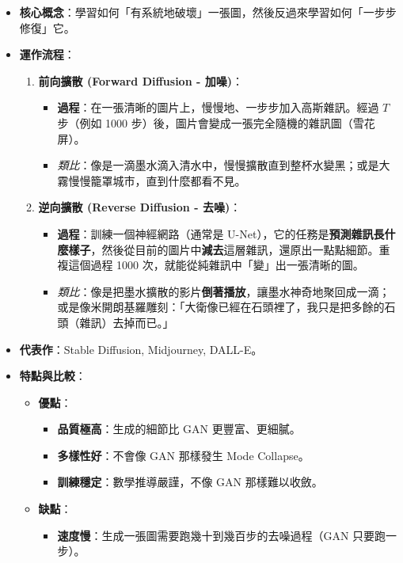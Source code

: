 \documentclass[
  letterpaper,
  DIV=11,
  numbers=noendperiod]{scrreprt}
\providecommand{\tightlist}{%
  \setlength{\itemsep}{0pt}\setlength{\parskip}{0pt}}
\begin{document}
\begin{itemize}
\tightlist
\item
  \textbf{核心概念}：學習如何「有系統地破壞」一張圖，然後反過來學習如何「一步步修復」它。
\item
  \textbf{運作流程}：

  \begin{enumerate}
  \def\labelenumi{\arabic{enumi}.}
  \tightlist
  \item
    \textbf{前向擴散 (Forward Diffusion - 加噪)}：

    \begin{itemize}
    \tightlist
    \item
      \textbf{過程}：在一張清晰的圖片上，慢慢地、一步步加入高斯雜訊。經過
      \(T\) 步（例如 1000
      步）後，圖片會變成一張完全隨機的雜訊圖（雪花屏）。
    \item
      \emph{類比}：像是一滴墨水滴入清水中，慢慢擴散直到整杯水變黑；或是大霧慢慢籠罩城市，直到什麼都看不見。
    \end{itemize}
  \item
    \textbf{逆向擴散 (Reverse Diffusion - 去噪)}：

    \begin{itemize}
    \tightlist
    \item
      \textbf{過程}：訓練一個神經網路（通常是
      U-Net），它的任務是\textbf{預測雜訊長什麼樣子}，然後從目前的圖片中\textbf{減去}這層雜訊，還原出一點點細節。重複這個過程
      1000 次，就能從純雜訊中「變」出一張清晰的圖。
    \item
      \emph{類比}：像是把墨水擴散的影片\textbf{倒著播放}，讓墨水神奇地聚回成一滴；或是像米開朗基羅雕刻：「大衛像已經在石頭裡了，我只是把多餘的石頭（雜訊）去掉而已。」
    \end{itemize}
  \end{enumerate}
\item
  \textbf{代表作}：Stable Diffusion, Midjourney, DALL-E。
\item
  \textbf{特點與比較}：

  \begin{itemize}
  \tightlist
  \item
    \textbf{優點}：

    \begin{itemize}
    \tightlist
    \item
      \textbf{品質極高}：生成的細節比 GAN 更豐富、更細膩。
    \item
      \textbf{多樣性好}：不會像 GAN 那樣發生 Mode Collapse。
    \item
      \textbf{訓練穩定}：數學推導嚴謹，不像 GAN 那樣難以收斂。
    \end{itemize}
  \item
    \textbf{缺點}：

    \begin{itemize}
    \tightlist
    \item
      \textbf{速度慢}：生成一張圖需要跑幾十到幾百步的去噪過程（GAN
      只要跑一步）。
    \end{itemize}
  \end{itemize}
\end{itemize}
\end{document}
